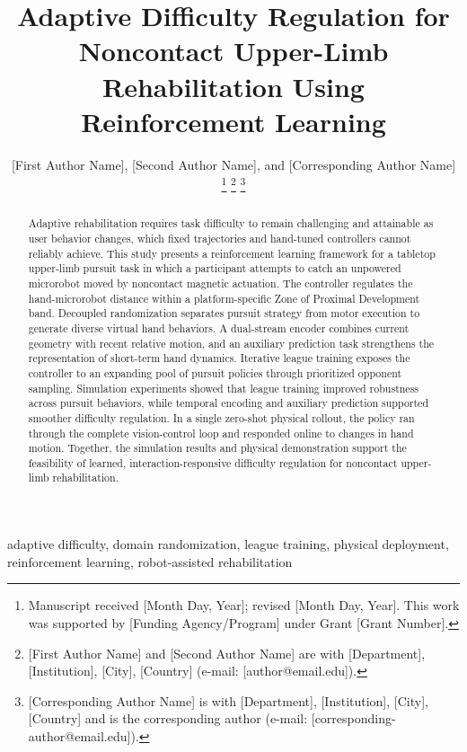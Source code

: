 \documentclass[journal,twoside,web]{ieeecolor2}
\begin{document}
\title{Adaptive Difficulty Regulation for Noncontact Upper-Limb Rehabilitation Using Reinforcement Learning}
\author{[First Author Name], [Second Author Name], and [Corresponding Author Name]
\thanks{Manuscript received [Month Day, Year]; revised [Month Day, Year]. This work was supported by [Funding Agency/Program] under Grant [Grant Number].}
\thanks{[First Author Name] and [Second Author Name] are with [Department], [Institution], [City], [Country] (e-mail: [author@email.edu]).}
\thanks{[Corresponding Author Name] is with [Department], [Institution], [City], [Country] and is the corresponding author (e-mail: [corresponding-author@email.edu]).}}
\maketitle

\begin{abstract}
Adaptive rehabilitation requires task difficulty to remain challenging and attainable as user behavior changes, which fixed trajectories and hand-tuned controllers cannot reliably achieve. This study presents a reinforcement learning framework for a tabletop upper-limb pursuit task in which a participant attempts to catch an unpowered microrobot moved by noncontact magnetic actuation. The controller regulates the hand-microrobot distance within a platform-specific Zone of Proximal Development band. Decoupled randomization separates pursuit strategy from motor execution to generate diverse virtual hand behaviors. A dual-stream encoder combines current geometry with recent relative motion, and an auxiliary prediction task strengthens the representation of short-term hand dynamics. Iterative league training exposes the controller to an expanding pool of pursuit policies through prioritized opponent sampling. Simulation experiments showed that league training improved robustness across pursuit behaviors, while temporal encoding and auxiliary prediction supported smoother difficulty regulation. In a single zero-shot physical rollout, the policy ran through the complete vision-control loop and responded online to changes in hand motion. Together, the simulation results and physical demonstration support the feasibility of learned, interaction-responsive difficulty regulation for noncontact upper-limb rehabilitation.
\end{abstract}

\begin{IEEEkeywords}
adaptive difficulty, domain randomization, league training, physical deployment, reinforcement learning, robot-assisted rehabilitation
\end{IEEEkeywords}
\end{document}
